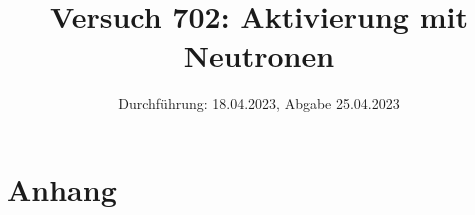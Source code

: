 

\title{Versuch 702: Aktivierung mit Neutronen}
\date{Durchführung: 18.04.2023, Abgabe 25.04.2023}


\maketitle
\thispagestyle{empty} 
\tableofcontents
\newpage
\setcounter{page}{1}






\printbibliography
\newpage

\section*{Anhang}

